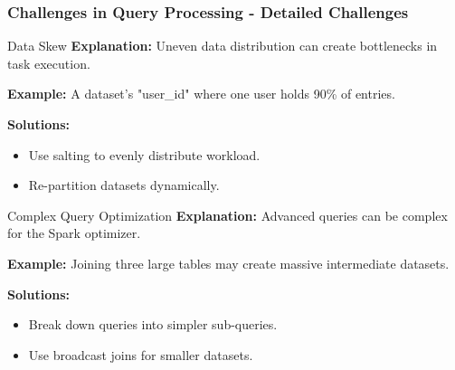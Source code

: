 \documentclass[aspectratio=169]{beamer}
\begin{document}
\begin{frame}[fragile]
    \frametitle{Challenges in Query Processing - Detailed Challenges}
    \begin{block}{Data Skew}
        \textbf{Explanation:} Uneven data distribution can create bottlenecks in task execution.
        
        \textbf{Example:} A dataset's "user_id" where one user holds 90\% of entries.
        
        \textbf{Solutions:}
        \begin{itemize}
            \item Use salting to evenly distribute workload.
            \item Re-partition datasets dynamically.
        \end{itemize}
    \end{block}

    \begin{block}{Complex Query Optimization}
        \textbf{Explanation:} Advanced queries can be complex for the Spark optimizer.
        
        \textbf{Example:} Joining three large tables may create massive intermediate datasets.
        
        \textbf{Solutions:}
        \begin{itemize}
            \item Break down queries into simpler sub-queries.
            \item Use broadcast joins for smaller datasets.
        \end{itemize}
    \end{block}
\end{frame}
\end{document}
